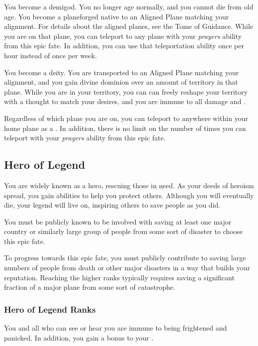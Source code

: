              You become a demigod.
            You no longer age normally, and you cannot die from old age.
            You become a planeforged native to an Aligned Plane matching your alignment.
            For details about the aligned planes, see the Tome of Guidance.
            While you are on that plane, you can teleport to any plane with your \textit{prayers} ability from this epic fate.
            In addition, you can use that teleportation ability once per hour instead of once per week.

             You become a deity.
            You are transported to an Aligned Plane matching your alignment, and you gain divine dominion over an amount of territory in that plane.
            While you are in your territory, you can can freely reshape your territory with a thought to match your desires, and you are immune to all damage and .

            Regardless of which plane you are on, you can teleport to anywhere within your home plane as a .
            In addition, there is no limit on the number of times you can teleport with your \textit{prayers} ability from this epic fate.

    \subsection{Hero of Legend}
        You are widely known as a hero, rescuing those in need.
        As your deeds of heroism spread, you gain abilities to help you protect others.
        Although you will eventually die, your legend will live on, inspiring others to save people as you did.

         You must be publicly known to be involved with saving at least one major country or similarly large group of people from some sort of disaster to choose this epic fate.

         To progress towards this epic fate, you must publicly contribute to saving large numbers of people from death or other major disasters in a way that builds your reputation.
        Reaching the higher ranks typically requires saving a significant fraction of a major plane from some sort of catastrophe.

        \subsubsection{Hero of Legend Ranks}
             You and all  who can see or hear you are immune to being frightened and panicked.
            In addition, you gain a  bonus to your .

